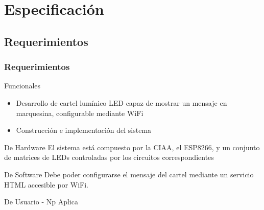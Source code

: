 \section{Especificación}

\subsection{Requerimientos}
\begin{frame}
	\frametitle{Requerimientos}
	\begin{block}{Funcionales}
			\begin{itemize}
			\item Desarrollo de cartel lumínico LED capaz de mostrar un mensaje en marquesina, configurable mediante WiFi
			\item Construcción e implementación del sistema
				\end{itemize}	
		
		\end{block}

	\begin{block}{De Hardware}
El sistema está compuesto por la CIAA, el ESP8266, y un conjunto de matrices de LEDs controladas por los circuitos correspondientes
\end{block}

	\begin{block}{De Software}
 Debe poder configurarse el mensaje del cartel mediante un servicio HTML accesible por WiFi.

\end{block}

	\begin{block}{De Usuario - Np Aplica}
	\end{block}
\end{frame}
	




